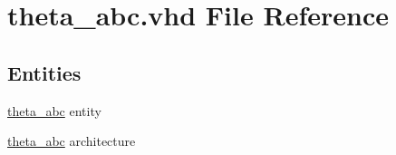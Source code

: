 \hypertarget{theta__abc_8vhd}{}\section{theta\+\_\+abc.\+vhd File Reference}
\label{theta__abc_8vhd}
\subsection*{Entities}
\begin{DoxyCompactItemize}
\item 
\hyperlink{classtheta__abc}{theta\+\_\+abc} entity
\item 
\hyperlink{classtheta__abc_1_1theta__abc}{theta\+\_\+abc} architecture
\end{DoxyCompactItemize}
